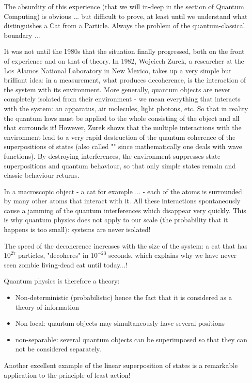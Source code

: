 	The absurdity of this experience (that we will in-deep in the section of Quantum Computing) is obvious ... but difficult to prove, at least until we understand what distinguishes a Cat from a Particle. Always the problem of the quantum-classical boundary ...

	It was not until the 1980s that the situation finally progressed, both on the front of experience and on that of theory. In 1982, Wojciech Zurek, a researcher at the Los Alamos National Laboratory in New Mexico, takes up a very simple but brilliant idea: in a measurement, what produces decoherence, is the interaction of the system with its environment. More generally, quantum objects are never completely isolated from their environment - we mean everything that interacts with the system: an apparatus, air molecules, light photons, etc. So that in reality the quantum laws must be applied to the whole consisting of the object and all that surrounds it! However, Zurek shows that the multiple interactions with the environment lead to a very rapid destruction of the quantum coherence of the superpositions of states (also called "" since mathematically one deals with wave functions). By destroying interferences, the environment suppresses state superpositions and quantum behaviour, so that only simple states remain and classic behaviour returns.
	
	In a macroscopic object - a cat for example ... - each of the atoms is surrounded by many other atoms that interact with it. All these interactions spontaneously cause a jamming of the quantum interferences which disappear very quickly. This is why quantum physics does not apply to our scale (the probability that it happens is too small): systems are never isolated!

	The speed of the decoherence increases with the size of the system: a cat that has $10^{27}$ particles, "decoheres" in $10^{-23}$ seconds, which explains why we have never seen zombie living-dead cat until today...!
	
	Quantum physics is therefore a theory:
	\begin{itemize}
		\item Non-deterministic (probabilistic) hence the fact that it is considered as a theory of information

		\item Non-local: quantum objects may simultaneously have several positions

		\item non-separable: several quantum objects can be superimposed so that they can not be considered separately.
	\end{itemize}
	Another excellent example of the linear superposition of states is a remarkable application to the principle of least action!

